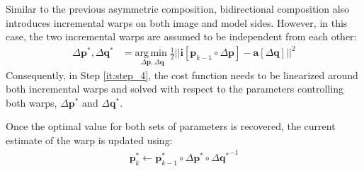 Similar to the previous asymmetric composition, bidirectional composition also introduces incremental warps on both image and model sides. However, in this case, the two incremental warps are assumed to be independent from each other:
\begin{equation}
    \begin{aligned}
        \Delta \mathbf{p}^*, \Delta \mathbf{q}^*  & = \underset{\Delta \mathbf{p}, \Delta \mathbf{q}} {\mathrm{arg\, min\;}} \frac{1}{2}|| \mathbf{i}[\mathbf{p}_{k-1} \circ \Delta \mathbf{p}] - \mathbf{a} [\Delta \mathbf{q}] ||^2
    \label{eq:ssd_bc}
    \end{aligned}
\end{equation}
Consequently, in Step \ref{it:step_4}, the cost function needs to be linearized around both incremental warps and solved with respect to the parameters controlling both warps, $\Delta \mathbf{p}^*$ and $\Delta \mathbf{q}^*$. 

Once the optimal value for both sets of parameters is recovered, the current estimate of the warp is updated using:
\begin{equation}
 	\begin{aligned}
    	\mathbf{p}_k^* \leftarrow \mathbf{p}_{k-1}^* \circ \Delta \mathbf{p}^* \circ \Delta {\mathbf{q}^*}^{-1} 
    \label{eq:bc_update}
    \end{aligned}
\end{equation}
